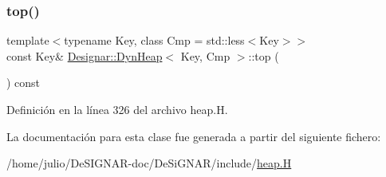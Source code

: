 \subsubsection{\texorpdfstring{top()}{top()}}
{\footnotesize\ttfamily template$<$typename Key, class Cmp = std\+::less$<$\+Key$>$$>$ \\
const Key\& \hyperlink{class_designar_1_1_dyn_heap}{Designar\+::\+Dyn\+Heap}$<$ Key, Cmp $>$\+::top (\begin{DoxyParamCaption}{ }\end{DoxyParamCaption}) const\hspace{0.3cm}{\ttfamily [inline]}}



Definición en la línea 326 del archivo heap.\+H.



La documentación para esta clase fue generada a partir del siguiente fichero\+:\begin{DoxyCompactItemize}
\item 
/home/julio/\+De\+S\+I\+G\+N\+A\+R-\/doc/\+De\+Si\+G\+N\+A\+R/include/\hyperlink{heap_8_h}{heap.\+H}\end{DoxyCompactItemize}
